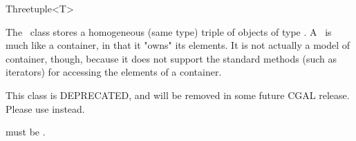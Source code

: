 \begin{ccRefClass}{Threetuple<T>}
  
  \ccDefinition The \ccRefName\ class stores a homogeneous (same type) triple
  of objects of type .  A \ccRefName\ is much like a container, in that
  it "owns" its elements. It is not actually a model of container, though,
  because it does not support the standard methods (such as iterators) for
  accessing the elements of a container.

  This class is DEPRECATED, and will be removed in some future CGAL release.
  Please use  instead.

  
  \ccRequirements {} must be .


  \ccTypes

  \ccGlue
  \ccGlue

  \ccCreation
  
  
  
\end{ccRefClass}


